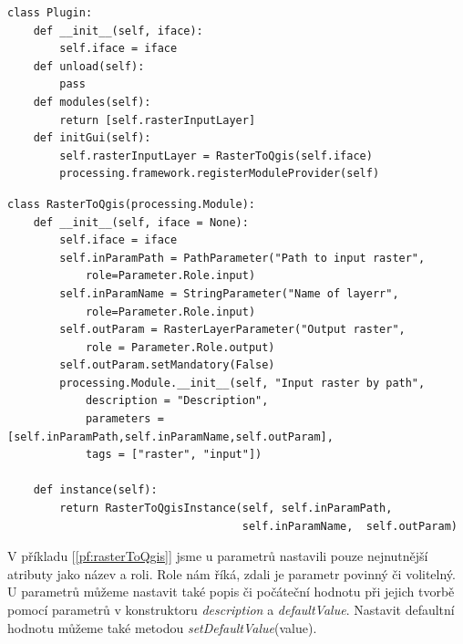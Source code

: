 \newpage
\begin{lstlisting}[caption={Třída Plugin pro QGIS Processing Framework}, label=pf:plugin, morekeywords={Plugin, __init__, modules, initGUI, unload}]
class Plugin:
    def __init__(self, iface):
        self.iface = iface
    def unload(self):
        pass
    def modules(self):
        return [self.rasterInputLayer]
    def initGui(self):
        self.rasterInputLayer = RasterToQgis(self.iface)
        processing.framework.registerModuleProvider(self)
\end{lstlisting}
\newpage
\begin{lstlisting}[caption={Třída RasterToQgis reprezentující modul pro QGIS Processing Framework}, label=pf:rasterToQgis, morekeywords={processing.Module,RasterToQgis, __init__, instance, RasterToQgisInstance, PathParameter, StringParameter, RasterLayerParameter}]
class RasterToQgis(processing.Module):
    def __init__(self, iface = None):
        self.iface = iface
        self.inParamPath = PathParameter("Path to input raster",
        	role=Parameter.Role.input)
        self.inParamName = StringParameter("Name of layerr",
        	role=Parameter.Role.input)
        self.outParam = RasterLayerParameter("Output raster",
        	role = Parameter.Role.output)
        self.outParam.setMandatory(False)
        processing.Module.__init__(self, "Input raster by path", 
            description = "Description",
            parameters = [self.inParamPath,self.inParamName,self.outParam], 
            tags = ["raster", "input"])

    def instance(self):
        return RasterToQgisInstance(self, self.inParamPath,
        							self.inParamName,  self.outParam)
\end{lstlisting}

V příkladu [\autoref{pf:rasterToQgis}] jsme u parametrů nastavili
pouze nejnutnější atributy jako název a roli. Role nám říká, zdali je
parametr povinný či volitelný. U parametrů můžeme nastavit také popis
či počáteční hodnotu při jejich tvorbě pomocí parametrů v
konstruktoru \textit{description} a \textit{defaultValue}. Nastavit
defaultní hodnotu můžeme také
metodou \textit{setDefaultValue}(value). \\

